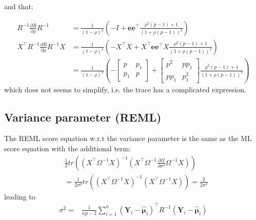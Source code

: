 \documentclass[12pt]{article}
\newcommand\Ve{\mathbf{e}}
\newcommand\VY{\mathbf{Y}}
\newcommand\Vmu{\boldsymbol{\mu}}
\newcommand\trans[1]{{#1}^\intercal}%
\begin{document}
and that:

\begin{align*}
R^{-1} \frac{\partial R}{\partial\rho} R^{-1} &= \frac{1}{(1-\rho)^2} \left(-I + \Ve\trans{\Ve} \frac{\rho^2(p-1) + 1}{(1+\rho(p-1))^2}\right) \\
\trans{X}R^{-1} \frac{\partial R}{\partial\rho} R^{-1} X &= \frac{1}{(1-\rho)^2} \left(-\trans{X}X + \trans{X}\Ve\trans{\Ve}X \frac{\rho^2(p-1) + 1}{(1+\rho(p-1))^2}\right)  \\
&= \frac{1}{(1-\rho)^2} \left(-\begin{bmatrix} p
                  & p_1
                  \\ p_1
                  & p
                  \end{bmatrix}
                  + \begin{bmatrix} p^2
                  & p p_1
                  \\ p p_1
                  & p_1^2
                  \end{bmatrix} \frac{\rho^2(p-1) + 1}{(1+\rho(p-1))^2}\right) 
\end{align*}
which does not seems to simplify, i.e. the trace has a complicated expression.

\subsection{Variance parameter (REML)}
\label{sec:orgdcd7693}

The REML score equation w.r.t the variance parameter is the same as the ML score equation with the additional term:
\begin{align*}
&\frac{1}{2} tr\left(\left(\trans{X}\Omega^{-1}X\right)^{-1} \left(\trans{X}\Omega^{-1}\frac{\partial \Omega}{\partial\sigma^2}\Omega^{-1}X \right) \right) \\
&= \frac{1}{2\sigma^2} tr\left(\left(\trans{X}\Omega^{-1}X\right)^{-1} \left(\trans{X}\Omega^{-1}X \right) \right) = \frac{2}{2\sigma^2}
\end{align*}
leading to
\begin{align*}
\sigma^2 =& \frac{1}{n p - 2} \sum_{i=1}^n \trans{(\VY_i-\widehat{\Vmu}_i)} R^{-1} (\VY_i-\widehat{\Vmu}_i) 
\end{align*}


\clearpage
\end{document}

